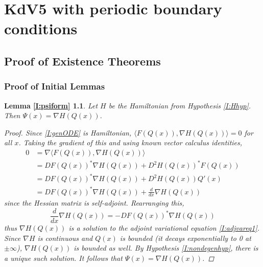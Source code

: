 \documentclass[thesis.tex]{subfiles}
\begin{document}
\chapter{KdV5 with periodic boundary conditions}

\section{Proof of Existence Theorems}

\subsection{Proof of Initial Lemmas}

\newtheorem*{lemma:psiform}{Lemma \ref{I:psiform}}
\begin{lemma:psiform}
Let $H$ be the Hamiltonian from Hypothesis \ref{I:Hhyp}. Then $\Psi(x) = \nabla H(Q(x))$.
\begin{proof}
Since \eqref{I:genODE} is Hamiltonian, $\langle F(Q(x)), \nabla H(Q(x)) \rangle = 0$ for all $x$. Taking the gradient of this and using known vector calculus identities,
\begin{align*}
0 &= \nabla \langle F(Q(x)), \nabla H(Q(x)) \rangle \\
&= D F(Q(x))^* \nabla H(Q(x)) + D^2 H(Q(x))^* F(Q(x)) \\
&= D F(Q(x))^* \nabla H(Q(x)) + D^2 H(Q(x)) Q'(x) \\
&= D F(Q(x))^* \nabla H(Q(x)) + \frac{d}{dx} \nabla H(Q(x))
\end{align*}
since the Hessian matrix is self-adjoint. Rearranging this,
\begin{equation*}
\frac{d}{dx} \nabla H(Q(x)) = -D F(Q(x))^* \nabla H(Q(x)) 
\end{equation*}
thus $\nabla H(Q(x))$ is a solution to the adjoint variational equation \eqref{I:adjvareq1}. Since $\nabla H$ is continuous and $Q(x)$ is bounded (it decays exponentially to 0 at $\pm \infty$), $\nabla H(Q(x))$ is bounded as well. By Hypothesis \ref{I:nondegenhyp}, there is a unique such solution. It follows that $\Psi(x) = \nabla H(Q(x))$.
\end{proof}
\end{lemma:psiform}
\end{document}
